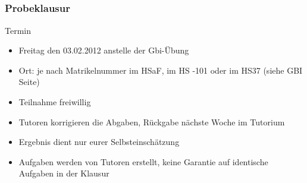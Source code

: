 \subsection*{}
\begin{frame}
	\frametitle{Probeklausur}
	\begin{block}{Termin}
		\begin{itemize}
			\item Freitag den 03.02.2012 anstelle der Gbi-Übung
			\item Ort: je nach Matrikelnummer im HSaF, im HS -101 oder im HS37 (siehe GBI Seite)
      \item Teilnahme freiwillig
      \item Tutoren korrigieren die Abgaben, Rückgabe nächste Woche im Tutorium
      \item Ergebnis dient nur eurer Selbsteinschätzung
      \item Aufgaben werden von Tutoren erstellt, keine Garantie auf identische Aufgaben in der Klausur
		\end{itemize}
  	\end{block}
\end{frame}
